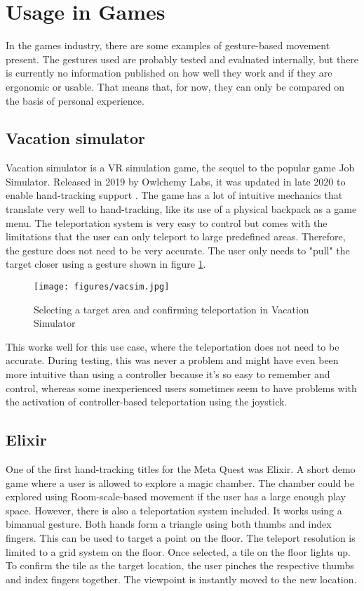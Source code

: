 \section{Usage in Games}
In the games industry, there are some examples of gesture-based movement present. The gestures used are probably tested and evaluated internally, but there is currently no information published on how well they work and if they are ergonomic or usable. That means that, for now, they can only be compared on the basis of personal experience. 


\subsection{Vacation simulator}
Vacation simulator \cite{VacSimOculus} is a VR simulation game, the sequel to the popular game Job Simulator. Released in 2019 by Owlchemy Labs, it was updated in late 2020 to enable hand-tracking support \cite{VacSimBlog}. The game has a lot of intuitive mechanics that translate very well to hand-tracking, like its use of a physical backpack as a game menu. The teleportation system is very easy to control but comes with the limitations that the user can only teleport to large predefined areas. Therefore, the gesture does not need to be very accurate. The user only needs to "pull" the target closer using a gesture shown in figure \ref{fig:pull}. 

\begin{figure}[hbt!]
  \centering
  \texttt{[image: figures/vacsim.jpg]}
  \caption{Selecting a target area and confirming teleportation in Vacation Simulator}
  \label{fig:pull}
\end{figure}

This works well for this use case, where the teleportation does not need to be accurate. During testing, this was never a problem and might have even been more intuitive than using a controller because it's so easy to remember and control, whereas some inexperienced users sometimes seem to have problems with the activation of controller-based teleportation using the joystick. 


\subsection{Elixir}
One of the first hand-tracking titles for the Meta Quest was Elixir. A short demo game where a user is allowed to explore a magic chamber. The chamber could be explored using Room-scale-based movement if the user has a large enough play space. However, there is also a teleportation system included. It works using a bimanual gesture. Both hands form a triangle using both thumbs and index fingers. This can be used to target a point on the floor. The teleport resolution is limited to a grid system on the floor. Once selected, a tile on the floor lights up. To confirm the tile as the target location, the user pinches the respective thumbs and index fingers together. The viewpoint is instantly moved to the new location.

